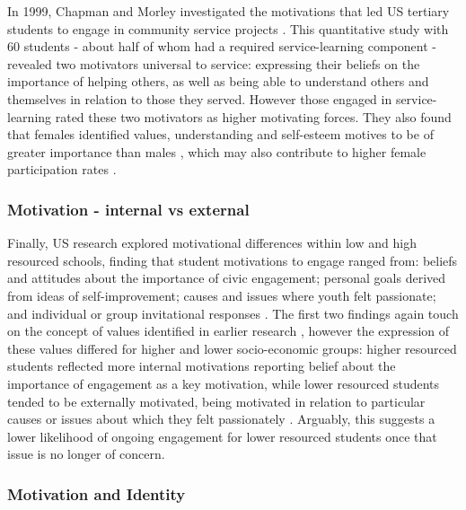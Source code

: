In 1999, Chapman and Morley investigated the motivations that led US tertiary students to engage in community service projects \citep{Chapman1999}. This quantitative study with 60 students - about half of whom had a required service-learning component - revealed two motivators universal to service: expressing their beliefs on the importance of helping others, as well as being able to understand others and themselves in relation to those they served. However those engaged in service-learning rated these two motivators as higher motivating forces. They also found that females identified values, understanding and self-esteem motives to be of greater importance than males \citep{Chapman1999}, which may also contribute to higher female participation rates \citep{Metz2003}. 

\subsubsection{Motivation - internal vs external}
Finally, US research explored motivational differences within low and high resourced schools, finding that student motivations to engage ranged from: beliefs and attitudes about the importance of civic engagement; personal goals derived from ideas of self-improvement; causes and issues where youth felt passionate; and individual or group invitational responses \citep{Ballard2014}. The first two findings again touch on the concept of values identified in earlier research \citep{Chapman1999}, however the expression of these values differed for higher and lower socio-economic groups: higher resourced students reflected more internal motivations reporting belief about the importance of engagement as a key motivation, while lower resourced students tended to be externally motivated, being motivated in relation to particular causes or issues about which they felt passionately \citep{Ballard2014}. Arguably, this suggests a lower likelihood of ongoing engagement for lower resourced students once that issue is no longer of concern.



\subsubsection{Motivation and Identity} 


